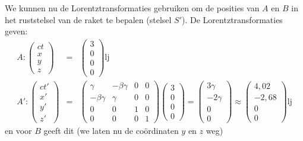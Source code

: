 We kunnen nu de Lorentztransformaties gebruiken om de posities van $A$ en $B$ in het ruststelsel van de raket te bepalen (stelsel $S'$). De Lorentztransformaties geven:
\begin{eqnarray}\nonumber
A: \left(\begin{array}{c} ct \\ x \\ y \\ z \end{array}\right) &=&  
  \left(\begin{array}{c} 3 \\ 0 \\ 0 \\ 0 \end{array}\right) \mbox{lj} \\ \nonumber
A':  \left(\begin{array}{c} ct' \\ x' \\ y' \\ z' \end{array}\right) &=&  
  \left(\begin{array}{cccc} \gamma & -\beta \gamma & 0 & 0 \\ -\beta\gamma & \gamma & 0 & 0 \\ 0 & 0 & 1 & 0 \\ 0 & 0 & 0 & 1 \end{array}\right)
\left(\begin{array}{c} 3 \\ 0 \\ 0 \\ 0 \end{array}\right) =
\left(\begin{array}{c} 3\gamma \\ -2 \gamma \\ 0 \\ 0 \end{array}\right) \approx \left(\begin{array}{c} 4,02 \\ -2,68 \\ 0 \\ 0 \end{array}\right) 
 \mbox{lj}
\end{eqnarray}
en voor $B$ geeft dit (we laten nu de co\"ordinaten $y$ en $z$ weg)
